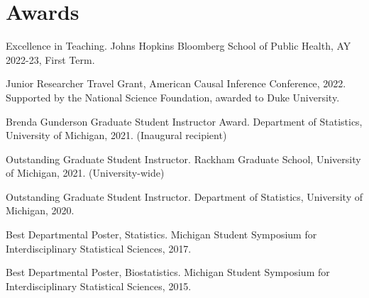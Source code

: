 \documentclass[letterpaper,11pt]{article} %
\begin{document}
    
    

	
	\section*{Awards}
	\begin{etaremune}
		\item Excellence in Teaching. Johns Hopkins Bloomberg School of Public Health, AY 2022-23, First Term.
		\item Junior Researcher Travel Grant, American Causal Inference Conference, 2022. Supported by the National Science Foundation, awarded to Duke University.
		\item Brenda Gunderson Graduate Student Instructor Award. Department of Statistics, University of Michigan, 2021. (Inaugural recipient)
		\item Outstanding Graduate Student Instructor. Rackham Graduate School, University of Michigan, 2021. (University-wide)
		\item Outstanding Graduate Student Instructor. Department of Statistics, University of Michigan, 2020.
		\item Best Departmental Poster, Statistics. Michigan Student Symposium for Interdisciplinary Statistical Sciences, 2017.
		\item Best Departmental Poster, Biostatistics. Michigan Student Symposium for Interdisciplinary Statistical Sciences, 2015.
	\end{etaremune}
	
\end{document}

